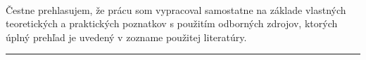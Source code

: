 ~\vfill

Čestne prehlasujem, že prácu \emph{\settingsTitle} som vypracoval samostatne na základe vlastných teoretických a praktických poznatkov s použitím odborných zdrojov, ktorých úplný prehľad je uvedený v zozname použitej literatúry. 

\vspace{2cm}

\hfill
\begin{minipage}{6cm}
\hrule\medskip \small \textit{\settingsAuthor}
\end{minipage}

\vspace{3cm}